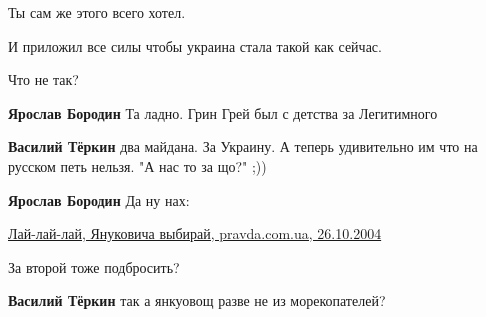 \begin{itemize}
Ты сам же этого всего хотел.

И приложил все силы чтобы украина стала такой как сейчас.

Что не так?

\begin{itemize}
 
\textbf{Ярослав Бородин}
Та ладно.
Грин Грей был с детства за Легитимного

 
\textbf{Василий Тёркин} два майдана. За Украину.
А теперь удивительно им что на русском петь нельзя.
"А нас то за що?"
;))

 
\textbf{Ярослав Бородин}
Да ну нах:

\href{https://www.pravda.com.ua/rus/news/2004/10/26/4382210/}{%
Лай-лай-лай, Януковича выбирай, pravda.com.ua, 26.10.2004%
}

 
За второй тоже подбросить?

 
\textbf{Василий Тёркин} так а янкуовощ разве не из морекопателей?

 

\end{itemize}
\end{itemize}
